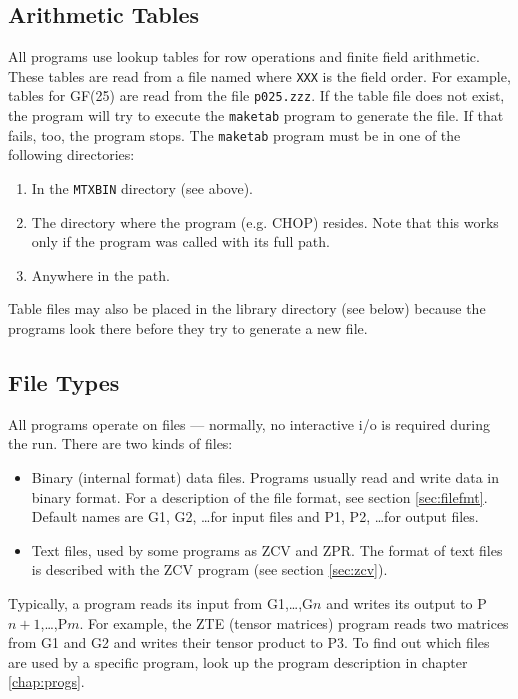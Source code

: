 \subsection*{Arithmetic Tables}
All programs use lookup tables for row operations and finite field
arithmetic. These tables are read from a file named
where \verb"XXX" is the field order. For example, tables for GF(25) are
read from the file {\tt p025.zzz}. If the table file does not exist,
the program will try to execute the \verb"maketab" program to generate
the file. If that fails, too, the program stops. The \verb"maketab"
program must be in one of the following directories:
\begin{enumerate}
\item
    In the \verb"MTXBIN" directory (see above).
\item
    The directory where the program ({e.g.} CHOP) resides. Note that
    this works only if the program was called with its full path.
\item
    Anywhere in the path.
\end{enumerate}

Table files may also be placed in the library directory (see below)
because the programs look there before they try to generate a new file.



\subsection*{File Types}
All {\MeatAxe} programs operate on files --- normally, no interactive
i/o is required during the run. There are two kinds of files:
\begin{itemize}
\item	Binary (internal format) data files. Programs usually read
	and write data in binary format. For a description of the
	file format, see section \ref{sec:filefmt}. Default names
	are G1, G2, \ldots for input files and P1, P2, \ldots for
	output files.
\item	Text files, used by some programs as ZCV and ZPR. The format
	of text files is described with the ZCV program (see section
	\ref{sec:zcv}).
\end{itemize}
Typically, a program reads its input from G1,\ldots,G$n$ and writes
its output to P$n+1$,\ldots,P$m$.
For example, the ZTE (tensor matrices) program
reads two matrices from G1 and G2 and writes their tensor product to
P3. To find out which files are used by a specific program, look up the
program description in chapter \ref{chap:progs}.

